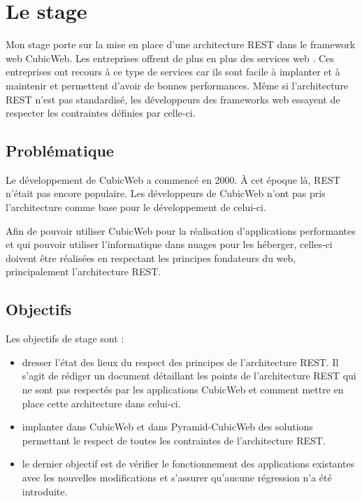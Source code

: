 \chapter{Le stage}
Mon stage porte sur la mise en place d'une architecture REST dans le framework web CubicWeb. Les entreprises offrent de plus en plus des services web . Ces entreprises ont recours à ce type de services car ils sont facile à implanter et à maintenir et permettent d'avoir de bonnes performances. Même si l'architecture REST n'est pas standardisé, les développeurs des frameworks web essayent de respecter les contraintes définies par celle-ci.   
\section{Problématique}
Le développement de CubicWeb a commencé en 2000. \`A cet époque là, REST n'était pas encore populaire. Les développeurs de CubicWeb n'ont pas pris l'architecture comme base pour le développement de celui-ci.  

Afin de pouvoir utiliser CubicWeb pour la réalisation d'applications 	performantes et qui pouvoir utiliser l'informatique dans nuages pour les héberger, celles-ci doivent être réalisées en respectant les principes fondateurs du web, principalement l'architecture REST.


\section{Objectifs}
Les objectifs de stage sont :
\begin{itemize}
	\item dresser l'état des lieux du respect des principes de l'architecture REST. Il s'agit de rédiger un document détaillant les points de l'architecture REST qui ne sont pas respectés par les applications CubicWeb et comment mettre en place cette architecture dans celui-ci.
	
	\item implanter dans CubicWeb et dans Pyramid-CubicWeb des solutions permettant le respect de toutes les contraintes de l'architecture REST. 
	
	\item le dernier objectif est de vérifier le fonctionnement des applications existantes avec les nouvelles modifications et s'assurer qu'aucune régression n'a été introduite. 
\end{itemize}